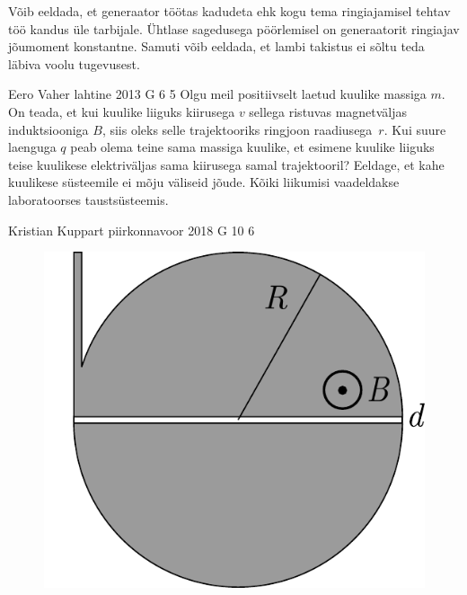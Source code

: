 \documentclass[11pt, twoside]{article}
\begin{document}
{{Võib eeldada, et generaator töötas kadudeta ehk kogu tema ringiajamisel tehtav
töö kandus üle tarbijale. Ühtlase sagedusega pöörlemisel on generaatorit
ringiajav jõumoment konstantne. Samuti võib eeldada, et lambi takistus ei sõltu
teda läbiva voolu tugevusest.
\fi
}

{Eero Vaher} %
{lahtine} %
{2013} %
{G 6} %
{5} %
{
\ifStatement
Olgu meil positiivselt laetud kuulike massiga $m$. On teada, et kui kuulike
liiguks kiirusega $v$ sellega ristuvas magnetväljas induktsiooniga $B$,
siis oleks selle trajektooriks ringjoon raadiusega~$r$. Kui suure laenguga $q$ peab olema teine sama massiga kuulike, et esimene
kuulike liiguks teise kuulikese elektriväljas sama kiirusega samal trajektooril? Eeldage, et
kahe kuulikese süsteemile ei mõju väliseid jõude. Kõiki liikumisi vaadeldakse
laboratoorses taustsüsteemis.
\pagebreak
\fi
}

{Kristian Kuppart} %
{piirkonnavoor} %
{2018} %
{G 10} %
{6} %
{
\ifStatement
\begin{figure}
	\begin{center}
		\includegraphics[width=\linewidth]{2018-v2g-10-tsyklotron}
	\end{center}
\end{figure}

}}
\end{document}

